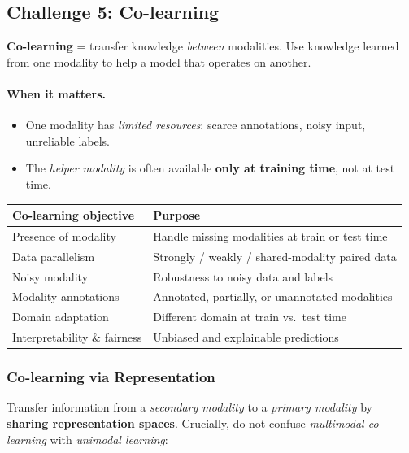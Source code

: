 \documentclass[11pt,a4paper]{article}
\theoremstyle{definition}
\theoremstyle{plain}
\theoremstyle{remark}
\begin{document}
\subsection{Challenge 5: Co-learning}

\textbf{Co-learning} = transfer knowledge \emph{between} modalities. Use knowledge learned from one modality to help a model that operates on another.

\paragraph{When it matters.}
\begin{itemize}
    \item One modality has \emph{limited resources}: scarce annotations, noisy input, unreliable labels.
    \item The \emph{helper modality} is often available \textbf{only at training time}, not at test time.
\end{itemize}

\begin{center}
\begin{tabular}{ll}
    \hline
    \textbf{Co-learning objective} & \textbf{Purpose} \\
    \hline
    Presence of modality        & Handle missing modalities at train or test time \\
    Data parallelism            & Strongly / weakly / shared-modality paired data \\
    Noisy modality              & Robustness to noisy data and labels \\
    Modality annotations        & Annotated, partially, or unannotated modalities \\
    Domain adaptation           & Different domain at train vs.\ test time \\
    Interpretability \& fairness & Unbiased and explainable predictions \\
    \hline
\end{tabular}
\end{center}

\subsubsection{Co-learning via Representation}

Transfer information from a \emph{secondary modality} to a \emph{primary modality} by \textbf{sharing representation spaces}. Crucially, do not confuse \emph{multimodal co-learning} with \emph{unimodal learning}:
\end{document}
